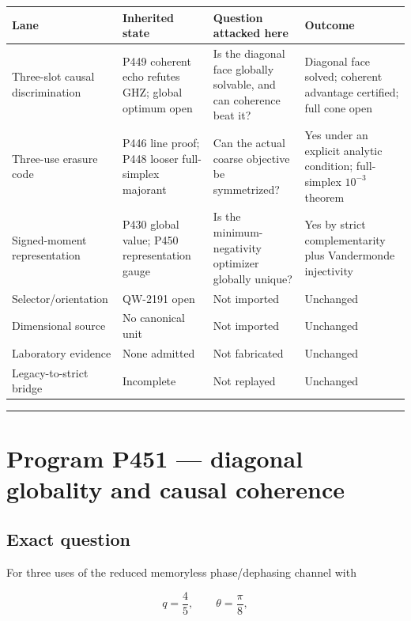 \documentclass[11pt,a4paper,openany]{report}
\begin{document}
\begin{center}
\begingroup\small
\setlength{\tabcolsep}{2.5pt}
\renewcommand{\arraystretch}{1.16}
\begin{longtable}{@{}p{}p{}p{}p{}@{}}
\toprule
\textbf{Lane} & \textbf{Inherited state} & \textbf{Question attacked here} & \textbf{Outcome} \\
\midrule
\endhead
Three-slot causal discrimination & P449 coherent echo refutes GHZ; global optimum open & Is the diagonal face globally solvable, and can coherence beat it? & Diagonal face solved; coherent advantage certified; full cone open \\
Three-use erasure code & P446 line proof; P448 looser full-simplex majorant & Can the actual coarse objective be symmetrized? & Yes under an explicit analytic condition; full-simplex \(10^{-3}\) theorem \\
Signed-moment representation & P430 global value; P450 representation gauge & Is the minimum-negativity optimizer globally unique? & Yes by strict complementarity plus Vandermonde injectivity \\
Selector/\allowbreak{}orientation & QW-2191 open & Not imported & Unchanged \\
Dimensional source & No canonical unit & Not imported & Unchanged \\
Laboratory evidence & None admitted & Not fabricated & Unchanged \\
Legacy-to-strict bridge & Incomplete & Not replayed & Unchanged \\
\bottomrule
\end{longtable}
\endgroup
\end{center}

\par\medskip\hrule\medskip

\chapter{Program P451 --- diagonal globality and causal coherence}

\section{Exact question}

For three uses of the reduced memoryless phase/\allowbreak{}dephasing channel with

\[
q=\frac45,\qquad \theta=\frac\pi8,
\]
\end{document}
